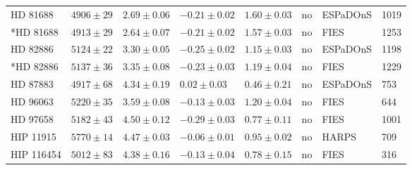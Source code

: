 \documentclass{aa}
\begin{document}
\begin{table}[htb!]
\begin{tabular}{llllllll}
     HD 81688     &  $4906 \pm  29$      &  $2.69 \pm 0.06$    &  $-0.21 \pm 0.02$    &  $1.60 \pm 0.03$             &             no              & ESPaDOnS     & 1019  \\  %
    *HD 81688     &  $4913 \pm  29$      &  $2.64 \pm 0.07$	   &  $-0.21 \pm 0.02$    &  $1.57 \pm 0.03$             &             no              & FIES         & 1253  \\
     HD 82886     &  $5124 \pm  22$      &  $3.30 \pm 0.05$    &  $-0.25 \pm 0.02$    &  $1.15 \pm 0.03$             &             no              & ESPaDOnS     & 1198  \\  %
    *HD 82886     &  $5137 \pm  36$      &  $3.35 \pm 0.08$	   &  $-0.23 \pm 0.03$    &  $1.19 \pm 0.04$             &             no              & FIES         & 1229  \\
     HD 87883     &  $4917 \pm  68$      &  $4.34 \pm 0.19$    &  $ 0.02 \pm 0.03$    &  $0.46 \pm 0.21$             &             no              & ESPaDOnS     &  753  \\  %
     HD 96063     &  $5220 \pm  35$      &  $3.59 \pm 0.08$	   &  $-0.13 \pm 0.03$    &  $1.20 \pm 0.04$             &             no              & FIES         &  644  \\
     HD 97658     &  $5182 \pm  43$      &  $4.50 \pm 0.12$    &  $-0.29 \pm 0.03$    &  $0.77 \pm 0.11$             &             no              & FIES         & 1001  \\  %
    HIP 11915     &  $5770 \pm  14$      &  $4.47 \pm 0.03$    &  $-0.06 \pm 0.01$    &  $0.95 \pm 0.02$             &             no              & HARPS        &  709  \\  %
   HIP 116454     &  $5012 \pm  83$      &  $4.38 \pm 0.16$	   &  $-0.13 \pm 0.04$    &  $0.78 \pm 0.15$             &             no              & FIES         &  316  \\

\end{tabular}
\end{table}
\end{document}
